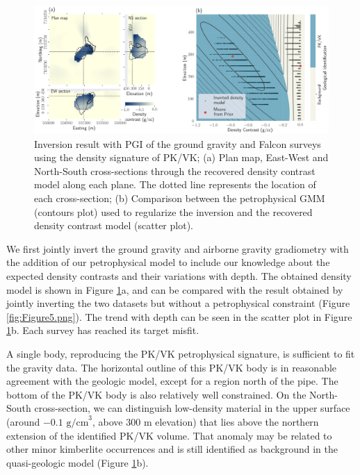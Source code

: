 \documentclass[paper, twocolumn]{geophysics} %
\begin{document}
\begin{figure}%
\centering
\includegraphics[width=\textwidth]{Figures/300dpi/Figure9.png}
\caption{Inversion result with PGI of the ground gravity and Falcon surveys using the density signature of PK/VK; (a) Plan map, East-West and North-South cross-sections through the recovered density contrast model along each plane. The dotted line represents the location of each cross-section; (b) Comparison between the petrophysical GMM (contours plot) used to regularize the inversion and the recovered density contrast model (scatter plot).}
\label{fig:Figure9.png}
\end{figure}%

We first jointly invert the ground gravity and airborne gravity gradiometry with the addition of our petrophysical model to include our knowledge about the expected density contrasts and their variations with depth. The obtained density model is shown in Figure \ref{fig:Figure9.png}a, and can be compared with the result obtained by jointly inverting the two datasets but without a petrophysical constraint (Figure \ref{fig:Figure5.png}). The trend with depth can be seen in the scatter plot in Figure \ref{fig:Figure9.png}b. Each survey has reached its target misfit.

A single body, reproducing the PK/VK petrophysical signature, is sufficient to fit the gravity data. The horizontal outline of this PK/VK body is in reasonable agreement with the geologic model, except for a region north of the pipe. The bottom of the PK/VK body is also relatively well constrained. On the North-South cross-section, we can distinguish low-density material in the upper surface (around $-0.1 \text{ g/cm}^3$, above $300$ m elevation) that lies above the northern extension of the identified PK/VK volume. That anomaly may be related to other minor kimberlite occurrences and is still identified as background in the quasi-geologic model (Figure \ref{fig:Figure9.png}b).
\end{document}
